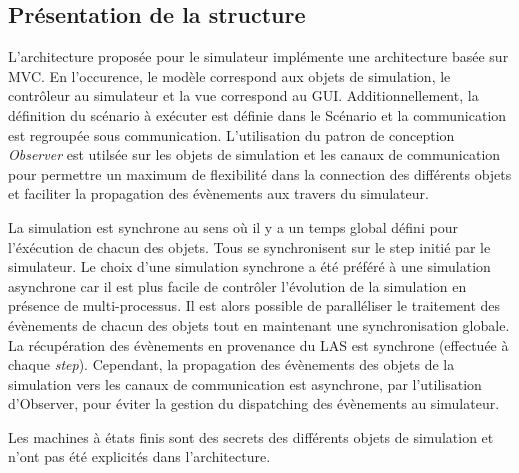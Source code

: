 \subsection{Présentation de la structure}

L'architecture proposée pour le simulateur implémente une architecture basée sur MVC.  En l'occurence, le modèle correspond aux objets de simulation, le contrôleur au simulateur et la vue correspond au GUI.  Additionnellement, la définition du scénario à exécuter est définie dans le Scénario et la communication est regroupée sous communication.  L'utilisation du patron de conception \textit{Observer} est utilsée sur les objets de simulation et les canaux de communication pour permettre un maximum de flexibilité dans la connection des différents objets et faciliter la propagation des évènements aux travers du simulateur.

La simulation est synchrone au sens où il y a un temps global défini pour l'éxécution de chacun des objets.  Tous se synchronisent sur le step initié par le simulateur.  Le choix d'une simulation synchrone a été préféré à une simulation asynchrone car il est plus facile de contrôler l'évolution de la simulation en présence de multi-processus.  Il est alors possible de paralléliser le traitement des évènements de chacun des objets tout en maintenant une synchronisation globale.  La récupération des évènements en provenance du LAS est synchrone (effectuée à chaque \textit{step}).  Cependant, la propagation des évènements des objets de la simulation vers les canaux de communication est asynchrone, par l'utilisation d'Observer, pour éviter la gestion du dispatching des évènements au simulateur.

Les machines à états finis sont des secrets des différents objets de simulation et n'ont pas été explicités dans l'architecture.
